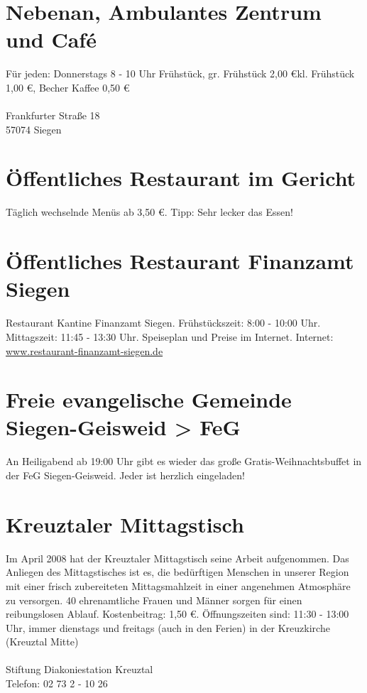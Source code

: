 \section{Nebenan, Ambulantes Zentrum und Café }
Für jeden: Donnerstags 8 - 10 Uhr Frühstück, gr. Frühstück 2,00 \euro kl. Frühstück 1,00 \euro, Becher Kaffee  0,50 \euro \\
\\
Frankfurter Straße 18\\
57074 Siegen

\section{Öffentliches Restaurant im Gericht }
Täglich wechselnde  Menüs ab 3,50 \euro. Tipp: Sehr lecker das Essen!

\section{Öffentliches Restaurant Finanzamt Siegen}
Restaurant Kantine Finanzamt Siegen. Frühstückszeit: 8:00 - 10:00 Uhr.  Mittagszeit: 11:45 - 13:30 Uhr. Speiseplan und Preise im Internet. Internet: \href{http://www.restaurant-finanzamt-siegen.de}{www.restaurant-finanzamt-siegen.de}

\section{Freie evangelische Gemeinde Siegen-Geisweid > FeG}
An Heiligabend ab 19:00 Uhr gibt es wieder das große Gratis-Weihnachtsbuffet in der FeG Siegen-Geisweid. Jeder ist herzlich eingeladen!

\section{Kreuztaler Mittagstisch}
Im April 2008 hat der Kreuztaler Mittagstisch seine Arbeit aufgenommen. Das Anliegen des Mittagstisches ist es, die bedürftigen Menschen in unserer Region mit einer frisch zubereiteten Mittagsmahlzeit in einer angenehmen Atmosphäre zu versorgen. 40 ehrenamtliche Frauen und Männer sorgen für einen reibungslosen Ablauf. Kostenbeitrag: 1,50 \euro. Öffnungszeiten sind: 11:30 - 13:00 Uhr, immer dienstags und freitags (auch in den Ferien) in der Kreuzkirche (Kreuztal Mitte)  \\
\\
Stiftung Diakoniestation Kreuztal\\
Telefon: 02 73 2 - 10 26 

